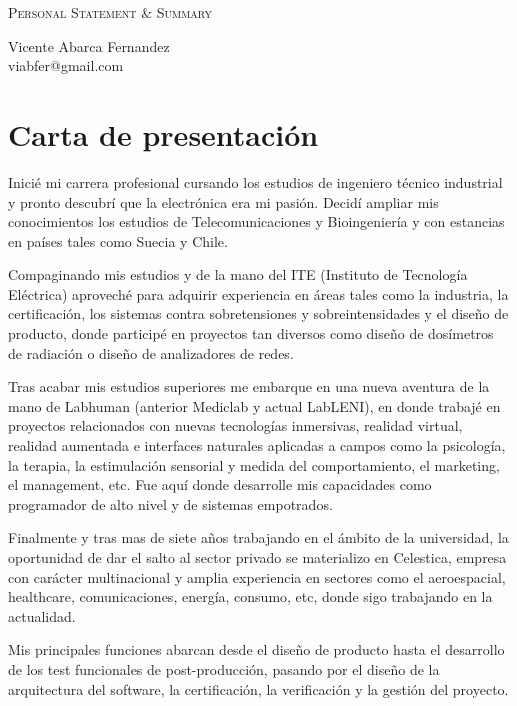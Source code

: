 \documentclass[letterpaper]{article}
\makeatletter
\newcommand{\soptitle}{Personal Statement \& Summary}
\newcommand{\yourname}{Vicente Abarca Fernandez}
\newcommand{\youremail}{viabfer@gmail.com}
\makeatother
\begin{document}
\begin{center}{\huge \scshape \soptitle}\end{center}
\begin{center}\vspace{0.2em} {\Large \yourname\\}
  {\youremail}\end{center}

\section*{Carta de presentación}

Inicié mi carrera profesional cursando los estudios de ingeniero técnico industrial y pronto descubrí que la electrónica era mi pasión. Decidí ampliar mis conocimientos los estudios de Telecomunicaciones y Bioingeniería y con estancias en países tales como Suecia y Chile.

Compaginando mis estudios y de la mano del ITE (Instituto de Tecnología Eléctrica)  aproveché para adquirir experiencia en áreas tales como la industria, la certificación, los sistemas contra sobretensiones y sobreintensidades y el diseño de producto, donde participé en proyectos tan diversos como diseño de dosímetros de radiación o diseño de analizadores de redes.

Tras acabar mis estudios superiores me embarque en una nueva aventura de la mano de Labhuman (anterior Mediclab y actual LabLENI), en donde trabajé en proyectos relacionados con nuevas tecnologías inmersivas, realidad virtual, realidad aumentada e interfaces naturales aplicadas a campos como la psicología, la terapia, la estimulación sensorial y medida del comportamiento, el marketing, el management, etc. Fue aquí donde desarrolle mis capacidades como programador de alto nivel y de sistemas empotrados.

Finalmente y tras mas de siete años trabajando en el ámbito de la universidad, la oportunidad de dar el salto al sector privado se materializo en Celestica, empresa con carácter multinacional y amplia experiencia en sectores como el aeroespacial, healthcare, comunicaciones, energía, consumo, etc, donde sigo trabajando en la actualidad.

Mis principales funciones abarcan desde el diseño de producto hasta el desarrollo de los test funcionales de post-producción, pasando por el diseño de la arquitectura del software, la certificación, la verificación y la gestión del proyecto.
\end{document}

